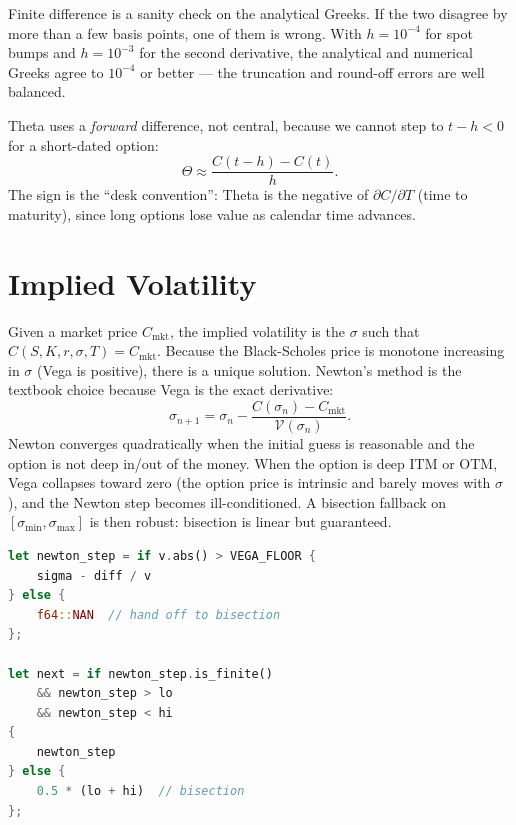 \begin{keyinsight}
Finite difference is a sanity check on the analytical Greeks. If the two
disagree by more than a few basis points, one of them is wrong. With
$h = 10^{-4}$ for spot bumps and $h = 10^{-3}$ for the second derivative,
the analytical and numerical Greeks agree to $10^{-4}$ or better --- the
truncation and round-off errors are well balanced.
\end{keyinsight}

Theta uses a \emph{forward} difference, not central, because we cannot
step to $t - h < 0$ for a short-dated option:
\[
\Theta \approx \frac{C(t - h) - C(t)}{h}.
\]
The sign is the ``desk convention'': Theta is the negative of
$\partial C / \partial T$ (time to maturity), since long options lose
value as calendar time advances.

\section{Implied Volatility}


Given a market price $C_{\text{mkt}}$, the implied volatility is the
$\sigma$ such that $C(S, K, r, \sigma, T) = C_{\text{mkt}}$. Because the
Black-Scholes price is monotone increasing in $\sigma$ (Vega is positive),
there is a unique solution. Newton's method is the textbook choice
because Vega is the exact derivative:
\[
\sigma_{n+1} = \sigma_n - \frac{C(\sigma_n) - C_{\text{mkt}}}{\mathcal{V}(\sigma_n)}.
\]
Newton converges quadratically when the initial guess is reasonable and
the option is not deep in/out of the money. When the option is deep ITM
or OTM, Vega collapses toward zero (the option price is intrinsic and
barely moves with $\sigma$), and the Newton step becomes ill-conditioned.
A bisection fallback on $[\sigma_{\min}, \sigma_{\max}]$ is then robust:
bisection is linear but guaranteed.

\begin{lstlisting}[language=Rust]
let newton_step = if v.abs() > VEGA_FLOOR {
    sigma - diff / v
} else {
    f64::NAN  // hand off to bisection
};

let next = if newton_step.is_finite()
    && newton_step > lo
    && newton_step < hi
{
    newton_step
} else {
    0.5 * (lo + hi)  // bisection
};
\end{lstlisting}

